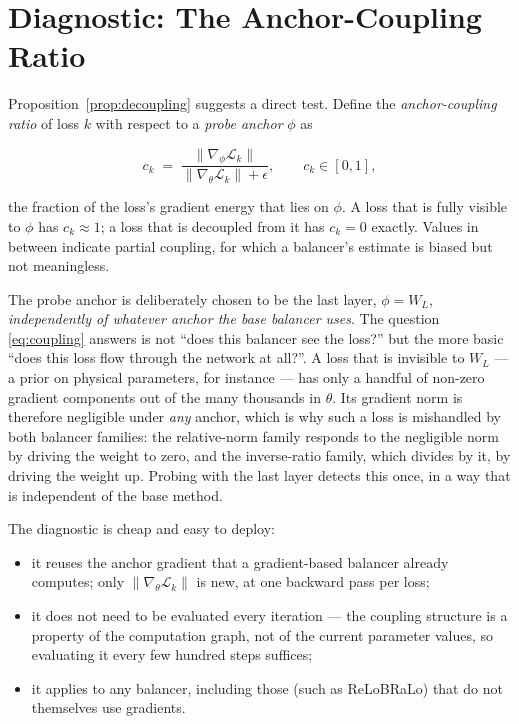 \documentclass[a4paper,fleqn]{cas-sc}
\begin{document}
\section{Diagnostic: The Anchor-Coupling Ratio}
\label{sec:diagnostic}

Proposition~\ref{prop:decoupling} suggests a direct test. Define the
\emph{anchor-coupling ratio} of loss $k$ with respect to a \emph{probe anchor}
$\phi$ as

\begin{equation}
c_k \;=\; \frac{\lVert \nabla_\phi \mathcal{L}_k \rVert}
{\lVert \nabla_\theta \mathcal{L}_k \rVert + \epsilon},
\qquad c_k \in [0,1],
\label{eq:coupling}
\end{equation}

the fraction of the loss's gradient energy that lies on $\phi$. A loss that is
fully visible to $\phi$ has $c_k \approx 1$; a loss that is decoupled from it
has $c_k = 0$ exactly. Values in between indicate partial coupling, for which
a balancer's estimate is biased but not meaningless.

The probe anchor is deliberately chosen to be the last layer, $\phi = W_L$,
\emph{independently of whatever anchor the base balancer uses}. The question
\eqref{eq:coupling} answers is not ``does this balancer see the loss?'' but the
more basic ``does this loss flow through the network at all?''. A loss that is
invisible to $W_L$ --- a prior on physical parameters, for instance --- has only
a handful of non-zero gradient components out of the many thousands in
$\theta$. Its gradient norm is therefore negligible under \emph{any} anchor,
which is why such a loss is mishandled by both balancer families: the
relative-norm family responds to the negligible norm by driving the weight to
zero, and the inverse-ratio family, which divides by it, by driving the weight
up. Probing with the last layer detects this once, in a way that is
independent of the base method.

The diagnostic is cheap and easy to deploy:

\begin{itemize}
\item it reuses the anchor gradient that a gradient-based balancer already
computes; only $\lVert\nabla_\theta \mathcal{L}_k\rVert$ is new, at one
backward pass per loss;
\item it does not need to be evaluated every iteration --- the coupling
structure is a property of the computation graph, not of the current
parameter values, so evaluating it every few hundred steps suffices;
\item it applies to any balancer, including those (such as ReLoBRaLo) that do
not themselves use gradients.
\end{itemize}
\end{document}
